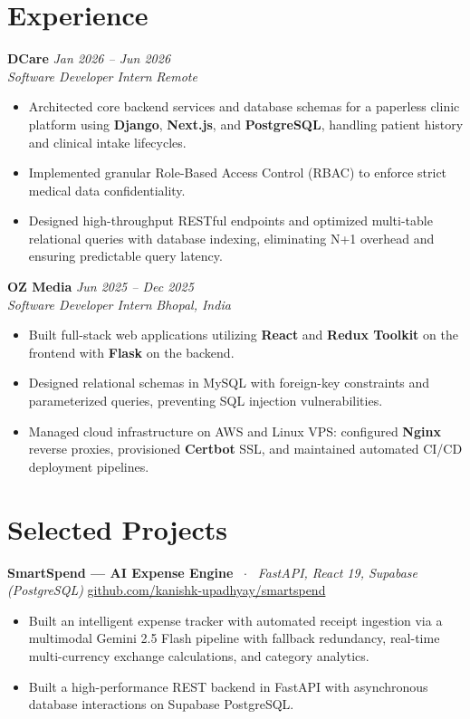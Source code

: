 \documentclass[10pt,a4paper]{article}
\begin{document}
\section{Experience}
\textbf{DCare} \hfill \textit{Jan 2026 -- Jun 2026} \\
\textit{Software Developer Intern} \hfill \textit{Remote}
\begin{itemize}
    \item Architected core backend services and database schemas for a paperless clinic platform using \textbf{Django}, \textbf{Next.js}, and \textbf{PostgreSQL}, handling patient history and clinical intake lifecycles.
    \item Implemented granular Role-Based Access Control (RBAC) to enforce strict medical data confidentiality.
    \item Designed high-throughput RESTful endpoints and optimized multi-table relational queries with database indexing, eliminating N+1 overhead and ensuring predictable query latency.
\end{itemize}

\textbf{OZ Media} \hfill \textit{Jun 2025 -- Dec 2025} \\
\textit{Software Developer Intern} \hfill \textit{Bhopal, India}
\begin{itemize}
    \item Built full-stack web applications utilizing \textbf{React} and \textbf{Redux Toolkit} on the frontend with \textbf{Flask} on the backend.
    \item Designed relational schemas in MySQL with foreign-key constraints and parameterized queries, preventing SQL injection vulnerabilities.
    \item Managed cloud infrastructure on AWS and Linux VPS: configured \textbf{Nginx} reverse proxies, provisioned \textbf{Certbot} SSL, and maintained automated CI/CD deployment pipelines.
\end{itemize}

\section{Selected Projects}
\textbf{SmartSpend — AI Expense Engine} \ $\cdot$ \ \textit{FastAPI, React 19, Supabase (PostgreSQL)} \hfill \href{https://github.com/kanishk-upadhyay/smartspend}{github.com/kanishk-upadhyay/smartspend}
\begin{itemize}
    \item Built an intelligent expense tracker with automated receipt ingestion via a multimodal Gemini 2.5 Flash pipeline with fallback redundancy, real-time multi-currency exchange calculations, and category analytics.
    \item Built a high-performance REST backend in FastAPI with asynchronous database interactions on Supabase PostgreSQL.
\end{itemize}
\end{document}
